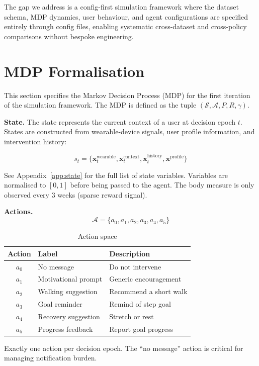 \documentclass[11pt,a4paper]{article}
\begin{document}
The gap we address is a config-first simulation framework where the dataset
schema, MDP dynamics, user behaviour, and agent configurations are specified
entirely through config files, enabling systematic cross-dataset and
cross-policy comparisons without bespoke engineering.

\section{MDP Formalisation}
\label{sec:mdp}

This section specifies the Markov Decision Process (MDP) for the first
iteration of the simulation framework. The MDP is defined as the tuple
$(\mathcal{S}, \mathcal{A}, P, R, \gamma)$.

\textbf{State.} The state represents the current context of a user at decision epoch $t$.
States are constructed from wearable-device signals, user profile
information, and intervention history:

\[
s_t = \{ \mathbf{x}_t^{\text{wearable}}, \mathbf{x}_t^{\text{context}},
\mathbf{x}_t^{\text{history}}, \mathbf{x}^{\text{profile}} \}
\]

See Appendix~\ref{app:state} for the full list of state variables.
Variables are normalised to $[0,1]$ before being passed to the agent. The
body measure is only observed every 3 weeks (sparse reward signal).

\textbf{Actions.}
\[
\mathcal{A} = \{ a_0, a_1, a_2, a_3, a_4, a_5 \}
\]

\begin{table}[H]
\centering
\caption{Action space}
\begin{tabular}{cll}
\toprule
Action & Label & Description \\
\midrule
$a_0$ & No message & Do not intervene \\
$a_1$ & Motivational prompt & Generic encouragement \\
$a_2$ & Walking suggestion & Recommend a short walk \\
$a_3$ & Goal reminder & Remind of step goal \\
$a_4$ & Recovery suggestion & Stretch or rest \\
$a_5$ & Progress feedback & Report goal progress \\
\bottomrule
\end{tabular}
\end{table}

Exactly one action per decision epoch. The ``no message'' action is critical
for managing notification burden.
\end{document}
